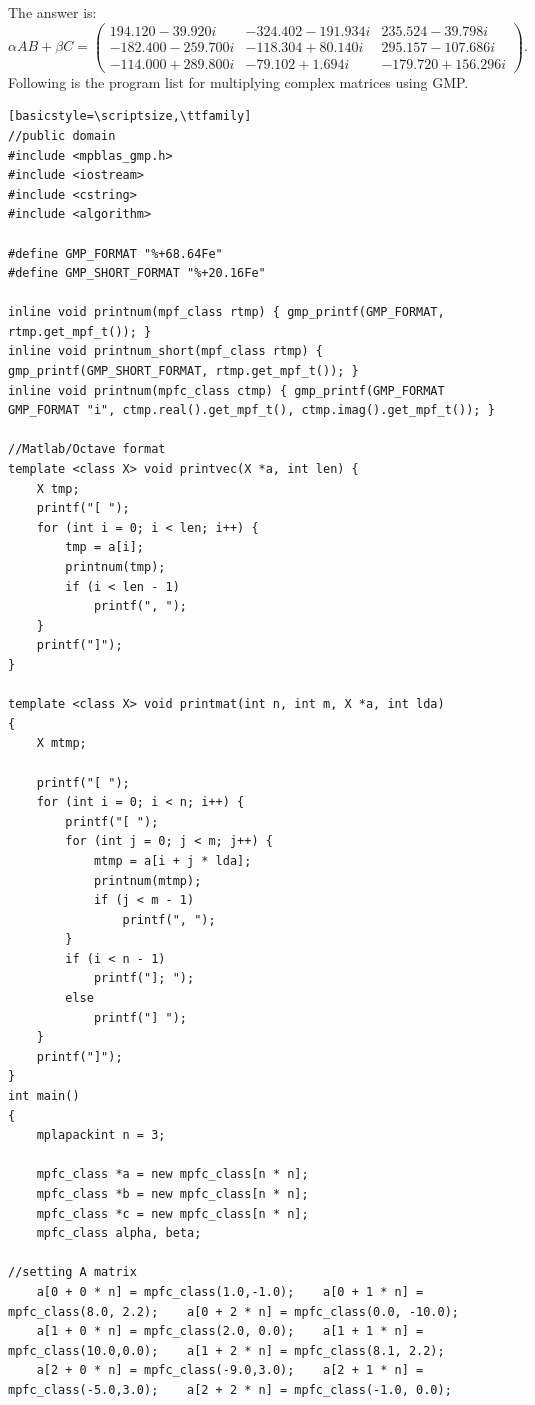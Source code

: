 \documentclass[12pt]{article}
\begin{document}
The answer is:
\begin{equation}
\alpha AB + \beta C = \left (
\begin{array}{rrr}
194.120 -  39.920i &-324.402 - 191.934i &  235.524 -  39.798i \\
  -182.400 - 259.700i & -118.304 +  80.140i &  295.157 - 107.686i \\
  -114.000 + 289.800i &-79.102 +   1.694i & -179.720 + 156.296i
\end{array}
\right ).
\end{equation}
Following is the program list for multiplying complex matrices using GMP.

\begin{lstlisting}[basicstyle=\scriptsize,\ttfamily]
//public domain
#include <mpblas_gmp.h>
#include <iostream>
#include <cstring>
#include <algorithm>

#define GMP_FORMAT "%+68.64Fe"
#define GMP_SHORT_FORMAT "%+20.16Fe"

inline void printnum(mpf_class rtmp) { gmp_printf(GMP_FORMAT, rtmp.get_mpf_t()); }
inline void printnum_short(mpf_class rtmp) { gmp_printf(GMP_SHORT_FORMAT, rtmp.get_mpf_t()); }
inline void printnum(mpfc_class ctmp) { gmp_printf(GMP_FORMAT GMP_FORMAT "i", ctmp.real().get_mpf_t(), ctmp.imag().get_mpf_t()); }

//Matlab/Octave format
template <class X> void printvec(X *a, int len) {
    X tmp;
    printf("[ ");
    for (int i = 0; i < len; i++) {
        tmp = a[i];
        printnum(tmp);
        if (i < len - 1)
            printf(", ");
    }
    printf("]");
}

template <class X> void printmat(int n, int m, X *a, int lda)
{
    X mtmp;

    printf("[ ");
    for (int i = 0; i < n; i++) {
        printf("[ ");
        for (int j = 0; j < m; j++) {
            mtmp = a[i + j * lda];
            printnum(mtmp);
            if (j < m - 1)
                printf(", ");
        }
        if (i < n - 1)
            printf("]; ");
        else
            printf("] ");
    }
    printf("]");
}
int main()
{
    mplapackint n = 3;

    mpfc_class *a = new mpfc_class[n * n];
    mpfc_class *b = new mpfc_class[n * n];
    mpfc_class *c = new mpfc_class[n * n];
    mpfc_class alpha, beta;

//setting A matrix
    a[0 + 0 * n] = mpfc_class(1.0,-1.0);    a[0 + 1 * n] = mpfc_class(8.0, 2.2);    a[0 + 2 * n] = mpfc_class(0.0, -10.0);
    a[1 + 0 * n] = mpfc_class(2.0, 0.0);    a[1 + 1 * n] = mpfc_class(10.0,0.0);    a[1 + 2 * n] = mpfc_class(8.1, 2.2);
    a[2 + 0 * n] = mpfc_class(-9.0,3.0);    a[2 + 1 * n] = mpfc_class(-5.0,3.0);    a[2 + 2 * n] = mpfc_class(-1.0, 0.0);


\end{lstlisting}
\end{document}
